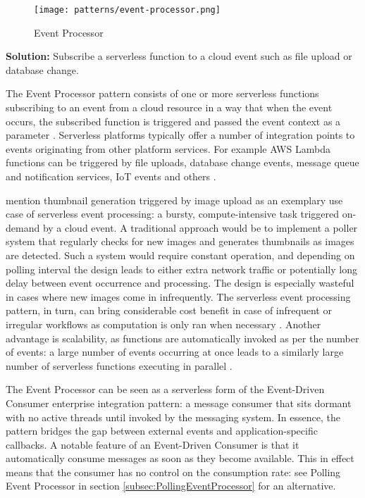 \begin{figure}[h]
  \centering
  \texttt{[image: patterns/event-processor.png]}
  \caption{Event Processor}
  \label{fig:patternEventProcessor}
\end{figure}

\textbf{Solution:} Subscribe a serverless function to a cloud event such as file upload or database change.

The Event Processor pattern consists of one or more serverless functions subscribing to an event from a cloud resource in a way that when the event occurs, the subscribed function is triggered and passed the event context as a parameter \parencite{hong18securingviaserverlesspatterns}. Serverless platforms typically offer a number of integration points to events originating from other platform services. For example AWS Lambda functions can be triggered by file uploads, database change events, message queue and notification services, IoT events and others \parencite{awslambda0218}.

\textcite{baldini17currentTrends} mention thumbnail generation triggered by image upload as an exemplary use case of serverless event processing: a bursty, compute-intensive task triggered on-demand by a cloud event. A traditional approach would be to implement a poller system that regularly checks for new images and generates thumbnails as images are detected. Such a system would require constant operation, and depending on polling interval the design leads to either extra network traffic or potentially long delay between event occurrence and processing. The design is especially wasteful in cases where new images come in infrequently. The serverless event processing pattern, in turn, can bring considerable cost benefit in case of infrequent or irregular workflows as computation is only ran when necessary \parencite{hong18securingviaserverlesspatterns}. Another advantage is scalability, as functions are automatically invoked as per the number of events: a large number of events occurring at once leads to a similarly large number of serverless functions executing in parallel \parencite{hong18securingviaserverlesspatterns}.

The Event Processor can be seen as a serverless form of the Event-Driven Consumer enterprise integration pattern: a message consumer that sits dormant with no active threads until invoked by the messaging system. In essence, the pattern bridges the gap between external events and application-specific callbacks. A notable feature of an Event-Driven Consumer is that it automatically consume messages as soon as they become available. This in effect means that the consumer has no control on the consumption rate: see Polling Event Processor in section \ref{subsec:PollingEventProcessor} for an alternative. \parencite{hohpe2004enterprise}

